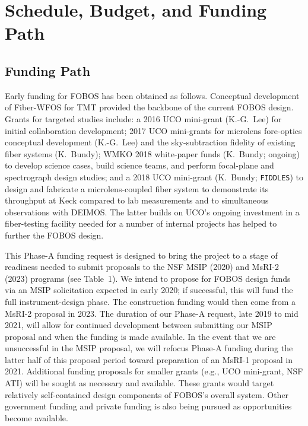 
\section{Schedule, Budget, and Funding Path}
\label{sec:budget}

\subsection{Funding Path}

Early funding for FOBOS has been obtained as follows. Conceptual
development of Fiber-WFOS for TMT provided the backbone of the
current FOBOS design. Grants for targeted studies include: a 2016 UCO
mini-grant (K.-G.~Lee) for initial collaboration development; 2017
UCO mini-grants for microlens fore-optics conceptual development
(K.-G.~Lee) and the sky-subtraction fidelity of existing fiber
systems (K.~Bundy); WMKO 2018 white-paper funds (K.~Bundy; ongoing)
to develop science cases, build science teams, and perform
focal-plane and spectrograph design studies; and a 2018 UCO
mini-grant (K.~Bundy; {\tt FIDDLES}) to design and fabricate a
microlens-coupled fiber system to demonstrate its throughput at Keck
compared to lab measurements and to simultaneous observations with
DEIMOS. The latter builds on UCO's ongoing investment in a
fiber-testing facility needed for a number of internal projects has
helped to further the FOBOS design.

This Phase-A funding request is designed to bring the project to a
stage of readiness needed to submit proposals to the NSF MSIP (2020)
and MsRI-2 (2023) programs (see Table~1). We intend to propose for
FOBOS design funds via an MSIP solicitation expected in early 2020;
if successful, this will fund the full instrument-design phase. The
construction funding would then come from a MsRI-2 proposal in 2023.
The duration of our Phase-A request, late 2019 to mid 2021, will
allow for continued development between submitting our MSIP proposal
and when the funding is made available. In the event that we are
unsuccessful in the MSIP proposal, we will refocus Phase-A funding
during the latter half of this proposal period toward preparation of
an MsRI-1 proposal in 2021. Additional funding proposals for smaller
grants (e.g., UCO mini-grant, NSF ATI) will be sought as necessary
and available. These grants would target relatively self-contained
design components of FOBOS's overall system. Other government funding
and private funding is also being pursued as opportunities become
available.

